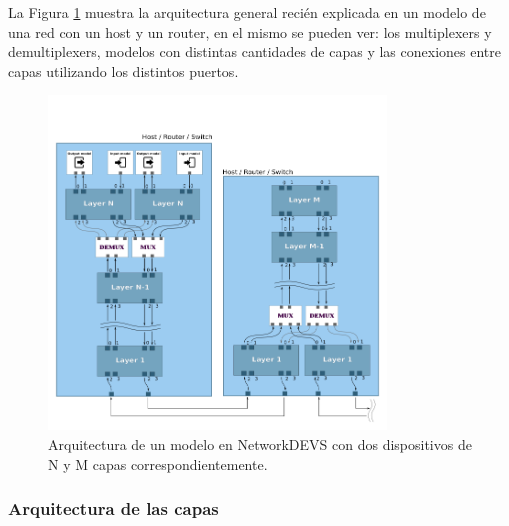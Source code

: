 \documentclass[10pt,a4paper]{article}
\begin{document}
La Figura \ref{figure:general architecture} muestra la arquitectura general recién explicada en un modelo de una red con un host y un router, en el mismo se pueden ver: los multiplexers y demultiplexers, modelos con distintas cantidades de capas y las conexiones entre capas utilizando los distintos puertos. \\

\begin{figure}[t]
    \centering
    \includegraphics[width = 0.8\textwidth]{img/png/general_architecture.png}
    \caption{Arquitectura de un modelo en NetworkDEVS con dos dispositivos de N y M capas correspondientemente.}
    \label{figure:general architecture}
\end{figure}

\newpage

\subsubsection{Arquitectura de las capas}
\end{document}
